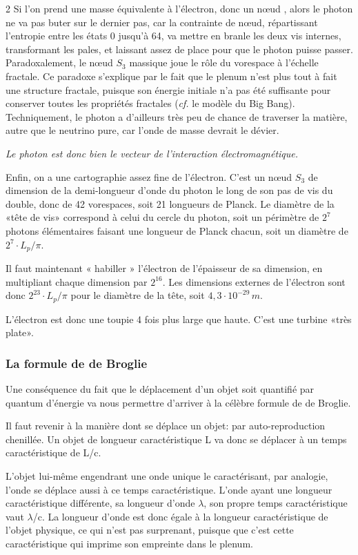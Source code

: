 \begin{multicols}{2}
Si l'on prend une masse équivalente à l'électron, donc un nœud
, alors le photon ne va pas buter sur le dernier pas, car la
contrainte de nœud, répartissant l'entropie entre les états 0 jusqu'à
64, va mettre en branle les deux vis internes, transformant les pales,
et laissant assez de place pour que le photon puisse passer.
Paradoxalement, le nœud $S_3$ massique joue le rôle du vorespace à
l'échelle fractale. Ce paradoxe s'explique par le fait que le plenum
n'est plus tout à fait une structure fractale, puisque son énergie
initiale n'a pas été suffisante pour conserver toutes les propriétés
fractales (\textit{cf.} le modèle du Big Bang). Techniquement, le photon a
d'ailleurs très peu de chance de traverser la matière, autre que le
neutrino pure, car l'onde de masse devrait le dévier.

\textit{Le photon est donc bien le vecteur de l'interaction électromagnétique.}

Enfin, on a une cartographie assez fine de l'électron. C'est un nœud
$S_3$ de dimension de la demi-longueur d'onde du photon le long de son pas de vis du double, donc de 42 vorespaces, soit 21 longueurs de Planck. Le diamètre de la «tête de vis» correspond à
celui du cercle du photon, soit un périmètre de $2^7$ photons
élémentaires faisant une longueur de Planck chacun, soit un diamètre
de $2^7 \cdot L_p/\pi$.

Il faut maintenant « habiller » l'électron de l'épaisseur de sa dimension, en multipliant chaque dimension par $2^{16}$. Les dimensions externes de l'électron sont donc $2^{23} \cdot L_p/\pi$ pour le diamètre de la tête, soit $4,3 \cdot 10^{-29}\,m$.

 L'électron est donc une toupie 4 fois plus large que
haute. C'est une turbine «très plate». 

\subsubsection{La formule de de Broglie}

Une conséquence du fait que le déplacement d'un objet soit quantifié
par quantum d'énergie va nous permettre d'arriver à la célèbre formule
de de Broglie.

Il faut revenir à la manière dont se déplace un objet: par
auto-reproduction chenillée. Un objet de longueur caractéristique L va
donc se déplacer à un temps caractéristique de L/c.

L'objet lui-même engendrant une onde unique le caractérisant, par
analogie, l'onde se déplace aussi à ce temps caractéristique. L'onde
ayant une longueur caractéristique différente, sa longueur d'onde
$\lambda$, son propre temps caractéristique vaut $\lambda$/c. La longueur
d'onde est donc égale à la longueur caractéristique de l'objet
physique, ce qui n'est pas surprenant, puisque que c'est cette
caractéristique qui imprime son empreinte dans le plenum.


\end{multicols}
